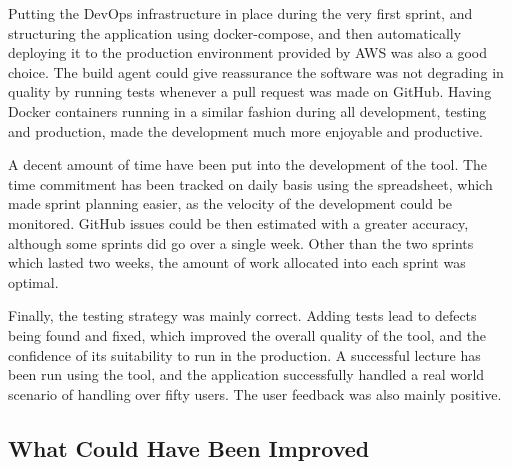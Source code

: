 Putting the DevOps infrastructure in place during the very first sprint, and structuring
the application using docker-compose, and then automatically deploying it to the
production environment provided by AWS was also a good choice. The build agent
could give reassurance the software was not degrading in quality by running tests
whenever a pull request was made on GitHub. Having Docker containers running in a
similar fashion during all development, testing and production, made the development
much more enjoyable and productive.

A decent amount of time have been put into the development of the tool. The time
commitment has been tracked on daily basis using the spreadsheet\cite{}, which
made sprint planning easier, as the velocity of the development could be monitored.
GitHub issues could be then estimated with a greater accuracy, although some
sprints did go over a single week. Other than the two sprints which lasted two weeks,
the amount of work allocated into each sprint was optimal.

Finally, the testing strategy was mainly correct. Adding tests lead to defects being
found and fixed, which improved the overall quality of the tool, and the confidence
of its suitability to run in the production. A successful lecture has been run using
the tool, and the application successfully handled a real world scenario of handling
over fifty users. The user feedback was also mainly positive. 

\subsection{What Could Have Been Improved}

